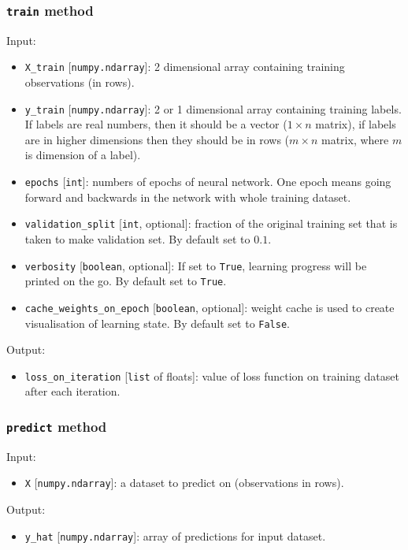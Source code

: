 \documentclass[a4]{article}
\begin{document}
\subsubsection{\texttt{train} method}
Input:
\begin{itemize}
	\item \texttt{X\_train} [\texttt{numpy.ndarray}]: 2 dimensional array containing training observations (in rows). 
	\item \texttt{y\_train} [\texttt{numpy.ndarray}]: 2 or 1 dimensional array containing training labels. If labels are real numbers, then it should be a vector ($1 \times n$ matrix), if labels are in higher dimensions then they should be in rows ($m \times n$ matrix, where $m$ is dimension of a label). 
	\item \texttt{epochs} [\texttt{int}]: numbers of epochs of neural network. One epoch means going forward and backwards in the network with whole training dataset.
	\item \texttt{validation\_split} [\texttt{int}, optional]: fraction of the original training set that is taken to make validation set. By default set to $0.1$.  
	\item \texttt{verbosity} [\texttt{boolean}, optional]: If set to \texttt{True}, learning progress will be printed on the go. By default set to \texttt{True}.
	\item \texttt{cache\_weights\_on\_epoch} [\texttt{boolean}, optional]: weight cache is used to create visualisation of learning state. By default set to \texttt{False}. 
\end{itemize}
Output:
\begin{itemize}
	\item \texttt{loss\_on\_iteration} [\texttt{list} of floats]: value of loss function on training dataset after each iteration. 
\end{itemize}

\subsubsection{\texttt{predict} method}
Input:
\begin{itemize}
	\item \texttt{X} [\texttt{numpy.ndarray}]: a dataset to predict on (observations in rows). 
\end{itemize}
Output:
\begin{itemize}
	\item \texttt{y\_hat} [\texttt{numpy.ndarray}]: array of predictions for input dataset.  
\end{itemize}
\end{document}
